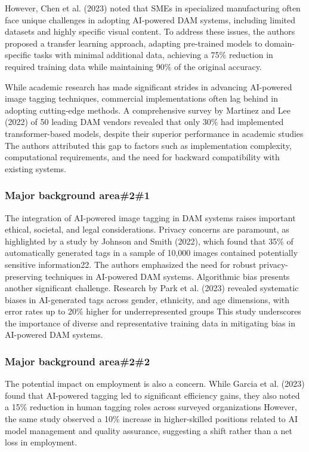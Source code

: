 \documentclass[a4paper,10pt,twocolumn]{article}
\numberwithin{figure}{section}
\numberwithin{table}{section}
\begin{document}
However, Chen et al. (2023) noted that SMEs in specialized manufacturing often 
face unique challenges in adopting AI-powered DAM systems, including limited datasets 
and highly specific visual content. 
To address these issues, the authors proposed a transfer learning approach, adapting pre-trained 
models to domain-specific tasks with minimal additional data, achieving a 75\% reduction in required 
training data while maintaining 90\% of the original accuracy.

While academic research has made significant strides in advancing AI-powered image tagging techniques, 
commercial implementations often lag behind in adopting cutting-edge methods. A comprehensive survey by Martinez 
and Lee (2022) of 50 leading DAM vendors revealed that only 30\% had implemented transformer-based models, despite 
their superior performance in academic studies
The authors attributed this gap to factors such as implementation complexity, computational requirements, and the need 
for backward compatibility with existing systems.




\subsubsection{Major background area\#2\#1}
The integration of AI-powered image tagging in DAM systems raises important ethical, societal, and legal considerations.
 Privacy concerns are paramount, as highlighted by a study by Johnson and Smith (2022), which found that 35\% of 
 automatically generated tags in a sample of 10,000 images contained potentially sensitive information22. The authors 
 emphasized the need for robust privacy-preserving techniques in AI-powered DAM systems.
 Algorithmic bias presents another significant challenge. Research by Park et al. (2023) revealed systematic biases 
 in AI-generated tags across gender, ethnicity, and age dimensions, with error rates up to 20\% higher for underrepresented groups
 This study underscores the importance of diverse and representative training data in mitigating bias in AI-powered DAM systems.
\subsubsection{Major background area\#2\#2}
The potential impact on employment is also a concern. While Garcia et al. (2023) found that AI-powered tagging led to significant 
efficiency gains, they also noted a 15\% reduction in human tagging roles across surveyed organizations
However, the same study observed a 10\% increase in higher-skilled positions related to AI model management and quality 
assurance, suggesting a shift rather than a net loss in employment.
\end{document}

